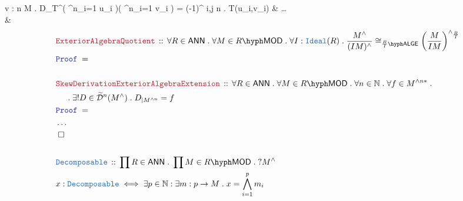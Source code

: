 \documentclass[12pt]{scrartcl}%
\newcommand{\TYPE}[1]{\textcolor{NavyBlue}{\mathtt{#1}}}%
\newcommand{\LOGIC}[1]{\textcolor{Blue}{\mathtt{#1}}}%
\newcommand{\THM}[1]{\textcolor{Maroon}{\mathtt{#1}}}%
\renewcommand{\.}{\; . \;} %
\newcommand{\Theorem}[2]{& \THM{#1} \, :: \, #2 \\ & \Proof = \\ } %
\newcommand{\DeclareType}[2]{& \TYPE{#1} \, :: \, #2 \\}%
\newcommand{\DefineType}[3]{& #1 : \TYPE{#2} \iff #3 \\}%
\newcommand{\NewLine}{\\ & \kern 1pc}%
\newcommand{\Page}[1]{ \begin{align*} #1 \end{align*}  }%
\newcommand{\NoProof}{ & \ldots \\ \EndProof}%
\newcommand{\Nat}{\mathbb{N}}%
\newcommand{\QED}{\; \square} %
\newcommand{\EndProof}{& \QED \\} %
\newcommand{\Proof}{\LOGIC{Proof} \; } %
\newcommand{\D}{\mathcal{D}}
\newcommand{\LMOD}[1]{#1\hyph\mathsf{MOD}} %
\newcommand{\ANN}{\mathsf{ANN}} %
\newcommand{\LALGE}[1]{#1\hyph\mathsf{ALGE}}%
\begin{document}
{{		\forall v : n \to M \. 
		D_T^\wedge \left( \bigwedge^n_{i=1} u_i \right)\left( \bigwedge^n_{i=1} v_i \right) 
		= (-1)^{}   \det \Lambda i,j \in n \. T(u_{i},v_{i}) 
	}	
	\NoProof
}\Page{
	\Theorem{ExteriorAlgebraQuotient}{
		\forall R \in \ANN \. 
		\forall M \in \LMOD{R} \. 
		\forall I : \TYPE{Ideal}(R) \. 
		\frac{M^\wedge}{(IM)^\wedge} \cong_{\LALGE{\frac{R}{I}}}  
		\left( \frac{M}{IM} \right)^{\wedge_{\frac{R}{I}}}   
	}
	\\
	\Theorem{SkewDerivationExteriorAlgebraExtension}{
			\forall R \in \ANN \. 
			\forall M \in \LMOD{R} \. 
			\forall n \in \Nat \.
			\forall f \in M^{\wedge n*}   \. \NewLine \.  
			\exists! D \in \widetilde{\D}^n(M^\wedge) \. D_{|M^{\wedge n}} = f
			}
	\NoProof
	\\
	\DeclareType{Decomposable}{\prod R \in \ANN \. \prod M \in \LMOD{R} \. ?M^\wedge }
	\DefineType{x}{Decomposable}{\exists p \in \Nat : \exists m: p \to M \. x = \bigwedge^p_{i=1} m_i }
	\\
}
\newpage
\end{document}

